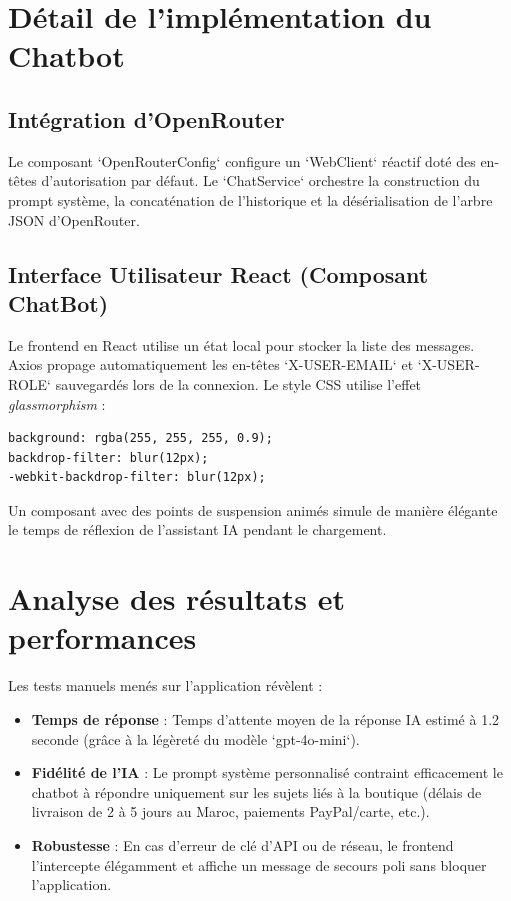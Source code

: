\documentclass[12pt,a4paper,oneside]{report}
\begin{document}
\section{Détail de l'implémentation du Chatbot}

\subsection{Intégration d'OpenRouter}
Le composant `OpenRouterConfig` configure un `WebClient` réactif doté des en-têtes d'autorisation par défaut.
Le `ChatService` orchestre la construction du prompt système, la concaténation de l'historique et la désérialisation de l'arbre JSON d'OpenRouter.

\subsection{Interface Utilisateur React (Composant ChatBot)}
Le frontend en React utilise un état local pour stocker la liste des messages. Axios propage automatiquement les en-têtes `X-USER-EMAIL` et `X-USER-ROLE` sauvegardés lors de la connexion.
Le style CSS utilise l'effet \textit{glassmorphism} :
\begin{lstlisting}[language=html, caption=Extrait CSS de l'effet Glassmorphism]
background: rgba(255, 255, 255, 0.9);
backdrop-filter: blur(12px);
-webkit-backdrop-filter: blur(12px);
\end{lstlisting}
Un composant avec des points de suspension animés simule de manière élégante le temps de réflexion de l'assistant IA pendant le chargement.

\section{Analyse des résultats et performances}
Les tests manuels menés sur l'application révèlent :
\begin{itemize}
    \item \textbf{Temps de réponse} : Temps d'attente moyen de la réponse IA estimé à 1.2 seconde (grâce à la légèreté du modèle `gpt-4o-mini`).
    \item \textbf{Fidélité de l'IA} : Le prompt système personnalisé contraint efficacement le chatbot à répondre uniquement sur les sujets liés à la boutique (délais de livraison de 2 à 5 jours au Maroc, paiements PayPal/carte, etc.).
    \item \textbf{Robustesse} : En cas d'erreur de clé d'API ou de réseau, le frontend l'intercepte élégamment et affiche un message de secours poli sans bloquer l'application.
\end{itemize}
\end{document}
